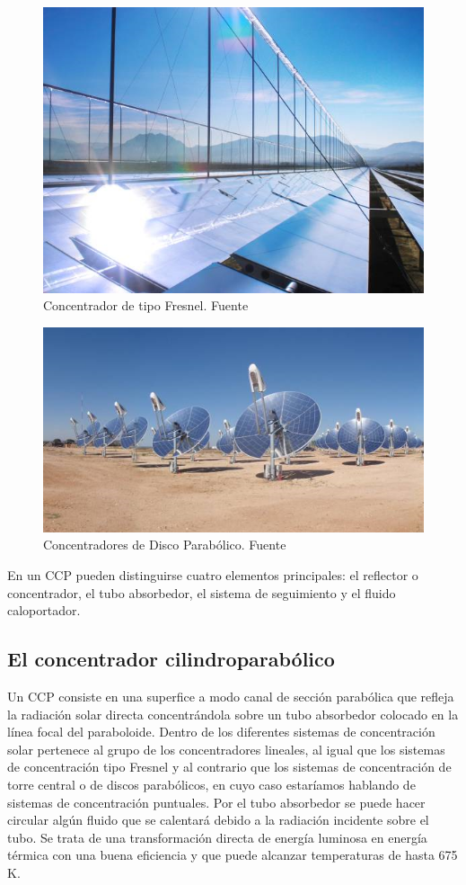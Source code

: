 \begin{figure}
\includegraphics[width=0.9\linewidth]{images/fresnel.png}
\caption{Concentrador de tipo Fresnel. Fuente \cite{Protermosolar}} 
\label{fig:fresnel}
\end{figure}

\begin{figure}
\includegraphics[width=0.9\linewidth]{images/disco.png}
\caption{Concentradores de Disco Parabólico. Fuente \cite{Protermosolar}} 
\label{fig:disco}
\end{figure}

En un CCP pueden distinguirse cuatro elementos principales: el reflector o concentrador, el tubo absorbedor, el sistema de seguimiento y el fluido caloportador.

\subsection{El concentrador cilindroparabólico}
\label{concentrador}
Un CCP consiste en una superfice a modo canal  de sección parabólica que refleja la radiación solar directa concentrándola sobre un tubo absorbedor colocado en la línea focal del paraboloide. Dentro de los diferentes sistemas de concentración solar pertenece al grupo de los concentradores lineales, al igual que los sistemas de concentración tipo Fresnel y al contrario que los sistemas de concentración de torre central o de discos parabólicos, en cuyo caso estaríamos hablando de sistemas de concentración puntuales. Por el tubo absorbedor se puede hacer circular algún fluido que se calentará debido a la radiación incidente sobre el tubo.  Se trata de una transformación directa de energía luminosa en energía térmica con una buena eficiencia y que puede alcanzar temperaturas de hasta 675 K.

